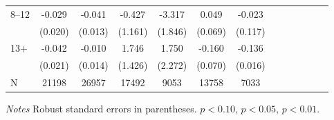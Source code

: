\documentclass[12pt,english]{article}
\begin{document}
\begin{table}[p]
\begin{center}
\begin{adjustbox}{max width=.9\linewidth}
\begin{threeparttable}
{\begin{tabular}{l*{6}{S S}}
						\hspace*{10mm}8--12 &   -0.029         &   -0.041\sym{***}&   -0.427         &   -3.317\sym{*}  &    0.049         &   -0.023         \\
						&  (0.020)         &  (0.013)         &  (1.161)         &  (1.846)         &  (0.069)         &  (0.117)         \\
						\hspace*{10mm}13+ &   -0.042\sym{**} &   -0.010         &    1.746         &    1.750         &   -0.160\sym{**} &   -0.136\sym{***}\\
						&  (0.021)         &  (0.014)         &  (1.426)         &  (2.272)         &  (0.070)         &  (0.016)         \\
						\midrule
									\midrule
						N               &    21198         &    26957         &    17492         &     9053         &    13758         &     7033         \\
						\bottomrule
					\end{tabular}
					\begin{tablenotes}
						\item \footnotesize \textit{Notes} Robust standard errors in parentheses. \sym{*} \(p<0.10\), \sym{**} \(p<0.05\), \sym{***} \(p<0.01\).
					\end{tablenotes}
				}
			\end{threeparttable}
		\end{adjustbox}
	\end{center}
\end{table}
\clearpage
\end{document}
